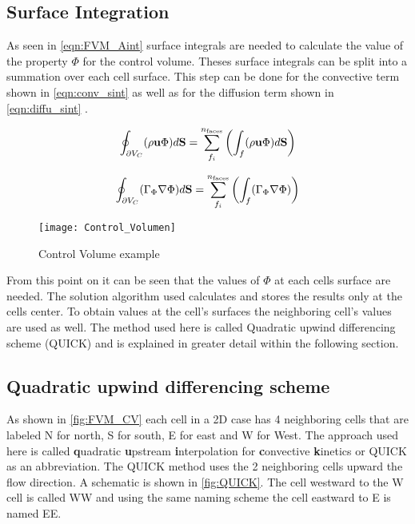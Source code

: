\documentclass[../thesis.tex]{subfiles}
\begin{document}
\subsection{Surface Integration}

As seen in \autoref{eqn:FVM_Aint} surface integrals are needed to calculate the value of the property $\Phi$ for the control volume. Theses surface integrals can be split into a summation over each cell surface. This step can be done for the convective term shown in \autoref{eqn:conv_sint} as well as for the diffusion term shown in \autoref{eqn:diffu_sint} \cite{darwish2021finite}.

\begin{equation}
	\label{eqn:conv_sint}
	\oint_{\partial V_C} (\rho \bold{u} \Phi) d\bold{S} = \sum_{f_i}^{n_{\text{faces}}}\left( \int_{f} (\rho \bold{u} \Phi) d\bold{S} \right)
\end{equation}

\begin{equation}
	\label{eqn:diffu_sint}
	\oint_{\partial V_C} (\Gamma_\Phi \nabla \Phi) d\bold{S} =  \sum_{f_i}^{n_{\text{faces}}}\left( \int_{f} (\Gamma_\Phi \nabla \Phi) \right)
\end{equation} 

\begin{figure}[htbp]
	\centering
	\texttt{[image: Control\_Volumen]}
	\caption{Control Volume example}
	\label{fig:FVM_CV}
\end{figure}

From this point on it can be seen that the values of $\Phi$ at each cells surface are needed. The solution algorithm used calculates and stores the results only at the cells center. To obtain values at the cell's surfaces the neighboring cell's values are used as well. The method used here is called Quadratic upwind differencing scheme (QUICK) and is explained in greater detail within the following section.

\subsection{Quadratic upwind differencing scheme}
\label{sec:QUICK}

As shown in \autoref{fig:FVM_CV} each cell in a 2D case has 4 neighboring cells that are labeled N for north, S for south, E for east and W for West. The approach used here is called \textbf{q}uadratic \textbf{u}pstream \textbf{i}nterpolation for \textbf{c}onvective \textbf{k}inetics \cite{versteeg2007introduction} or QUICK as an abbreviation. The QUICK method uses the 2 neighboring cells upward the flow direction. A schematic is shown in \autoref{fig:QUICK}. The cell westward to the W cell is called WW and using the same naming scheme the cell eastward to E is named EE.
\end{document}
